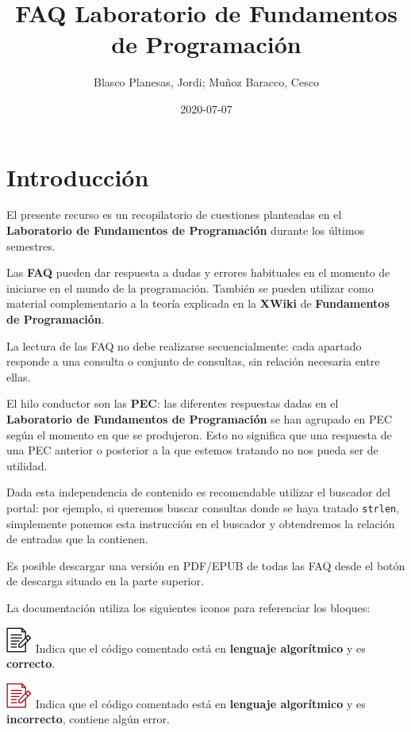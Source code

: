 \documentclass[
]{book}
\title{FAQ Laboratorio de Fundamentos de Programación}
\author{Blasco Planesas, Jordi; Muñoz Baracco, Cesco}
\date{2020-07-07}
\begin{document}
\frontmatter
\maketitle

{
\setcounter{tocdepth}{1}
\tableofcontents
}
\mainmatter
\hypertarget{introducciuxf3n}{%
\chapter*{Introducción}\label{introducciuxf3n}}

El presente recurso es un recopilatorio de cuestiones planteadas en el \textbf{Laboratorio de Fundamentos de Programación} durante los últimos semestres.

Las \textbf{FAQ} pueden dar respuesta a dudas y errores habituales en el momento de iniciarse en el mundo de la programación. También se pueden utilizar como material complementario a la teoría explicada en la \textbf{XWiki} de \textbf{Fundamentos de Programación}.

La lectura de las FAQ no debe realizarse secuencialmente: cada apartado responde a una consulta o conjunto de consultas, sin relación necesaria entre ellas.

El hilo conductor son las \textbf{PEC}: las diferentes respuestas dadas en el \textbf{Laboratorio de Fundamentos de Programación} se han agrupado en PEC según el momento en que se produjeron. Esto no significa que una respuesta de una PEC anterior o posterior a la que estemos tratando no nos pueda ser de utilidad.

Dada esta independencia de contenido es recomendable utilizar el buscador del portal: por ejemplo, si queremos buscar consultas donde se haya tratado \texttt{strlen}, simplemente ponemos esta instrucción en el buscador y obtendremos la relación de entradas que la contienen.

Es posible descargar una versión en PDF/EPUB de todas las FAQ desde el botón de descarga situado en la parte superior.

La documentación utiliza los siguientes iconos para referenciar los bloques:

\includegraphics{./img/alg.png} Indica que el código comentado está en \textbf{lenguaje algorítmico} y es \textbf{correcto}.

\includegraphics{./img/alg_err.png} Indica que el código comentado está en \textbf{lenguaje algorítmico} y es \textbf{incorrecto}, contiene algún error.
\end{document}
